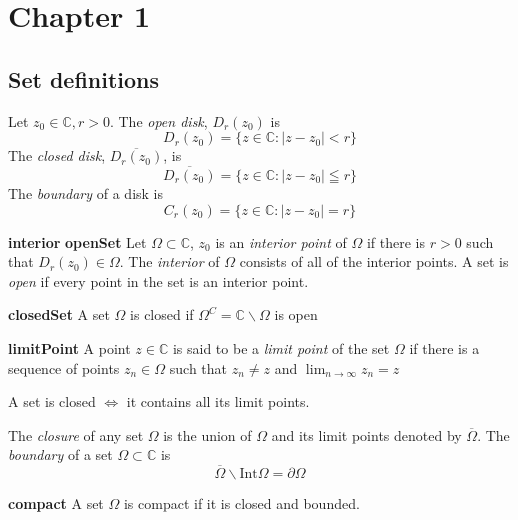 \documentclass{article}
\newenvironment{definition}[1][Definition]{\begin{trivlist}
\item[\hskip \labelsep {\bfseries #1}]}{\end{trivlist}}
\newenvironment{notation}[1][Notation]{\begin{trivlist}
\item[\hskip \labelsep {\bfseries #1}]}{\end{trivlist}}
\newcommand{\C}{\mathbb{C}}
\begin{document}
\section*{Chapter 1} %
\setcounter{section}{1}
\subsection*{Set definitions}
\begin{notation}
    Let $z_0 \in \C, r > 0$. The \textit{open disk}, $D_r(z_0)$ is
    $$D_r(z_0) = \{ z \in \C: |z - z_0| < r\}$$
    The \textit{closed disk}, $\overline{D_r(z_0)}$, is
    $$\overline{D_r(z_0)} = \{ z \in \C: |z - z_0| \leqq r\} $$
    The \textit{boundary} of a disk is
    $$C_r(z_0) = \{z \in \C: |z-z_0| = r\}$$
\end{notation}

\begin{definition} \label{interior} \textbf{interior}\label{openSet} \textbf{openSet}
    Let $\Omega \subset \C$, $z_0$ is an \textit{interior point} of $\Omega$ if
    there is $r > 0$ such that $D_r(z_0) \in \Omega$. The \textit{interior} of
    $\Omega$ consists of all of the interior points. A set is \textit{open} if
    every point in the set is an interior point.
\end{definition}

\begin{definition} \label{closedSet} \textbf{closedSet}
    A set $\Omega$ is closed if $\Omega^C = \C\backslash\Omega$ is open
\end{definition}

\begin{definition} \label{limitPoint} \textbf{limitPoint}
    A point $z \in \C$ is said to be a \textit{limit point} of the set $\Omega$
    if there is a sequence of points $z_n \in \Omega$ such that $z_n \neq z$ and
    \(\lim_{n \rightarrow \infty} z_n = z\)
\end{definition}

A set is closed $\Leftrightarrow$ it contains all its limit points.

\begin{notation}
    The \textit{closure} of any set $\Omega$ is the union of $\Omega$ and its limit
    points denoted by $\overline{\Omega}$. The \textit{boundary} of a set
    $\Omega \subset \C$ is $$\overline{\Omega}\backslash\text{Int}\Omega = \partial\Omega$$
\end{notation}

\begin{definition} \label{compact} \textbf{compact}
    A set $\Omega$ is compact if it is closed and bounded.
\end{definition}
\end{document}
